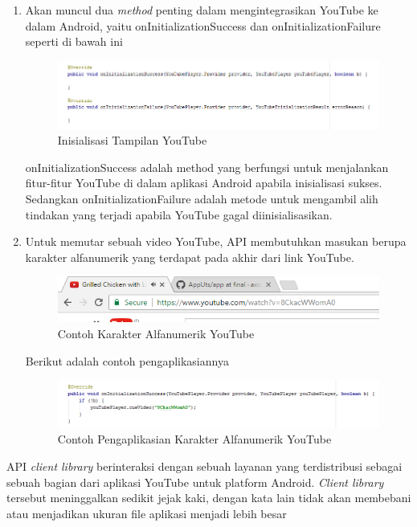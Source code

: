 \begin{enumerate}
		\item Akan muncul dua \textit{method} penting dalam mengintegrasikan YouTube ke dalam Android, yaitu onInitializationSuccess dan onInitializationFailure seperti di bawah ini 
		\begin{figure}[H]
			\centering
			\includegraphics[width=1\textwidth]{gambar/y10}
			\caption{Inisialisasi Tampilan YouTube}
		\end{figure}
		onInitializationSuccess adalah method yang berfungsi untuk menjalankan fitur-fitur YouTube di dalam aplikasi Android apabila inisialisasi sukses. Sedangkan onInitializationFailure adalah metode untuk mengambil alih tindakan yang terjadi apabila YouTube gagal diinisialisasikan.
		
		\item Untuk memutar sebuah video YouTube, API membutuhkan masukan berupa karakter alfanumerik yang terdapat pada akhir dari link YouTube.
		\begin{figure}[H]
			\centering
			\includegraphics[width=1\textwidth]{gambar/y12}
			\caption{Contoh Karakter Alfanumerik YouTube}
		\end{figure}
		
		Berikut adalah contoh pengaplikasiannya
		\begin{figure}[H]
			\centering
			\includegraphics[width=1\textwidth]{gambar/y11}
			\caption{Contoh Pengaplikasian Karakter Alfanumerik YouTube}
		\end{figure}
		
	\end{enumerate}
		
	
	API \emph{client library} berinteraksi dengan sebuah layanan yang terdistribusi sebagai sebuah bagian dari aplikasi YouTube untuk platform Android. \emph{Client library} tersebut meninggalkan sedikit jejak kaki, dengan kata lain tidak akan membebani atau menjadikan ukuran file aplikasi menjadi lebih besar
	

